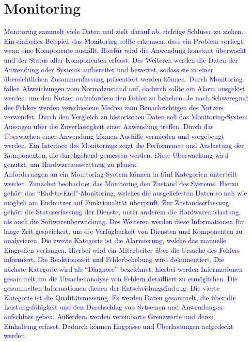 \section{Monitoring}\label{sec:monitoring}
\textcolor{blue}{
Monitoring sammelt viele Daten und zielt darauf ab, richtige Schlüsse zu ziehen.
Ein einfaches Beispiel, das Monitoring sollte erkennen, dass ein Problem vorliegt, wenn eine Komponente ausfällt.
Hierfür wird die Anwendung konstant überwacht und der Status aller Komponenten erfasst.
Des Weiteren werden die Daten der Anwendung oder Systems aufbereitet und bewertet, sodass sie in einer übersichtlichen Zusammenfassung präsentiert werden können.
Durch Monitoring fallen Abweichungen vom Normalzustand auf, dadurch sollte ein Alarm ausgelöst werden, um den Nutzer aufzufordern den Fehler zu beheben.
Je nach Schweregrad des Fehlers werden verschiedene Medien zum Benachrichtigen des Nutzers verwendet.
Durch den Vergleich zu historischen Daten soll das Monitoring-System Aussagen über die Zuverlässigkeit einer Anwendung treffen.
Durch das Überwachen einer Anwendung können Ausfälle vermieden und vorgebeugt werden.
Ein Interface des Monitorings zeigt die Performance und Auslastung der Komponenten, die durchgehend gemessen werden.
Diese Überwachung wird genutzt, um Hardwareausstattung zu planen.
\\
Anforderungen an ein Monitoring-System können in fünf Kategorien unterteilt werden.
Zunächst beobachtet das Monitoring den Zustand des Systems.
Hierzu gehört das \enquote{End-to-End}-Monitoring, welches die ausgelieferten Daten so nah wie möglich am Endnutzer auf Funktionalität überprüft.
Zur Zustandserfassung gehört die Statuserfassung der Dienste, unter anderem die Hardwareauslastung, als auch die Softwareüberwachung.
Des Weiteren werden diese Informationen für lange Zeit gespeichert, um die Verfügbarkeit von Diensten und Komponenten zu analysieren.
Die zweite Kategorie ist die Alarmierung, welche das manuelle Eingreifen verlangen.
Hierbei wird ein Mitarbeiter über die Ursache des Fehlers informiert.
Die Reaktionszeit und Fehlerbehebung wird dokumentiert.
Die nächste Kategorie wird als \enquote{Diagnose} bezeichnet, hierbei werden Informationen gesammelt,um die Ursachenanalyse von Fehlern detailliert zu ermöglichen.
Die gesammelten Informationen dienen der Entscheidungsfindung.
Die vierte Kategorie ist die Qualitätsmessung.
Es werden Daten gesammelt, die über die Leistungsfähigkeit und den Durchschlag von Sytsemen und Anwendungen aufschluss geben.
Außerdem werden vereinbarte Grenzwerte und deren Einhaltung erfasst.
Dadurch können Engpässe und Überlastungen aufgedeckt werden.
}
